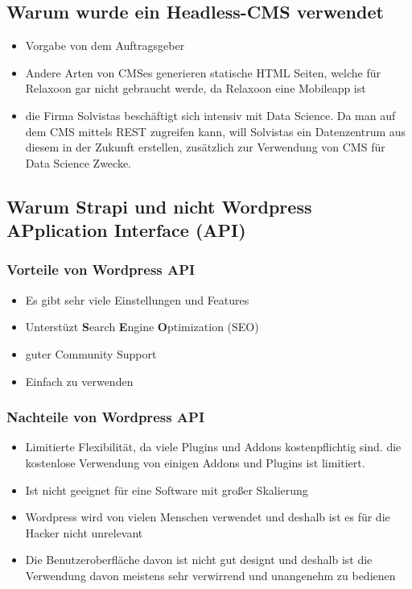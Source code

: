 \begin{spacing}{1}
    \subsection{Warum wurde ein Headless-CMS verwendet}
    \begin{itemize}
        \item Vorgabe von dem Auftragsgeber
        \item Andere Arten von CMSes generieren statische HTML Seiten, welche für Relaxoon gar nicht gebraucht werde,
              da Relaxoon eine Mobileapp ist
        \item die Firma Solvistas beschäftigt sich intensiv mit Data Science. Da man auf dem CMS mittels REST zugreifen kann,
              will Solvistas ein Datenzentrum aus diesem in der Zukunft erstellen, zusätzlich zur Verwendung von CMS für Data Science Zwecke.
    \end{itemize}
    \subsection{Warum Strapi und nicht Wordpress \textbf{AP}plication \textbf{I}nterface (API)}



    \subsubsection{Vorteile von Wordpress API}

    \begin{itemize}
        \item Es gibt sehr viele Einstellungen und Features
        \item Unterstüzt \textbf{S}earch \textbf{E}ngine \textbf{O}ptimization (SEO)
        \item guter Community Support
        \item Einfach zu verwenden
    \end{itemize}
    \cite{strapi-vs-wordpress}

    \subsubsection{Nachteile von Wordpress API}
    \begin{itemize}
        \item  Limitierte Flexibilität, da viele Plugins und Addons kostenpflichtig sind.
              die kostenlose Verwendung von einigen Addons und Plugins ist limitiert.
        \item Ist nicht geeignet für eine Software mit großer Skalierung
        \item Wordpress wird von vielen Menschen verwendet und deshalb ist es für die Hacker nicht unrelevant
        \item Die Benutzeroberfläche davon ist nicht gut designt und deshalb ist die Verwendung davon meistens sehr verwirrend und unangenehm zu bedienen
    \end{itemize}
    \cite{strapi-vs-wordpress}


\end{spacing}
